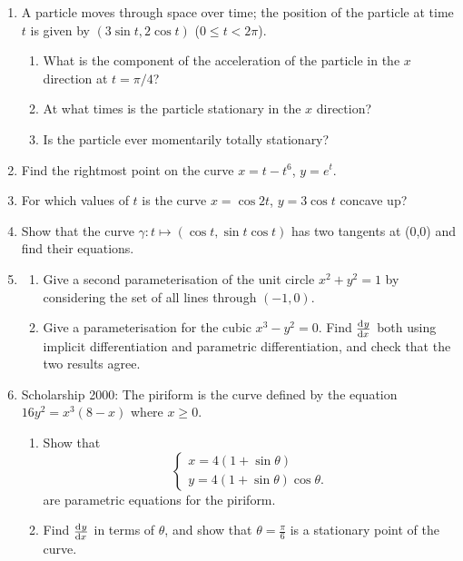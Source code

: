 \begin{enumerate}
\begin{center}
        \end{center}
  \item A particle moves through space over time; the position of the particle at time $ t $ is
        given by $ (3\sin t, 2\cos t) $ ($ 0 \leq t < 2\pi $).
    \begin{enumerate}
      \item What is the component of the acceleration of the particle in the $ x $ direction at $ t = \pi/4 $?
      \item At what times is the particle stationary in the $ x $ direction?
      \item Is the particle ever momentarily totally stationary?
    \end{enumerate}
  \item Find the rightmost point on the curve $ x = t - t^6 $, $ y = e^t $.
  \item For which values of $ t $ is the curve $ x = \cos 2t $, $ y = 3\cos t $ concave up?
  \item Show that the curve $ \gamma : t \mapsto (\cos t, \sin t \cos t) $ has two tangents at (0,0)
        and find their equations.
  \item
    \begin{enumerate}
      \item Give a second parameterisation of the unit circle $ x^2 + y^2 = 1 $ by considering the set of all lines through $ (-1,0) $.
      \item Give a parameterisation for the cubic $ x^3 - y^2 = 0 $. Find $ \od{y}{x} $ both using implicit differentiation and parametric
            differentiation, and check that the two results agree.
    \end{enumerate}
  \item Scholarship 2000: The piriform is the curve defined by the equation $ 16y^2 = x^3(8-x) $ where $ x \geq 0 $.
    \begin{enumerate}
      \item Show that
            \begin{displaymath}\begin{cases}
              x = 4(1 + \sin \theta)\\
              y = 4(1 + \sin \theta)\cos \theta.
            \end{cases}\end{displaymath}
            are parametric equations for the piriform.
      \item Find $ \od{y}{x} $ in terms of $ \theta $, and show that $ \theta = \frac{\pi}{6} $ is a stationary point of the curve.

\end{enumerate}
\end{enumerate}
